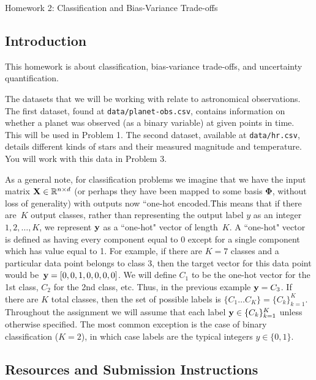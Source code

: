 \documentclass[submit]{harvardml}
\begin{document}
\begin{center}
{\Large Homework 2: Classification and Bias-Variance Trade-offs}\\
\end{center}

\subsection*{Introduction}

This homework is about classification, bias-variance trade-offs, and
uncertainty quantification.

The datasets that we will be working with relate to astronomical
observations. The first dataset, found at \verb|data/planet-obs.csv|,
contains information on whether a planet was observed (as a binary
variable) at given points in time. This will be used in Problem 1. The
second dataset, available at \verb|data/hr.csv|, details different
kinds of stars and their measured magnitude and temperature. You will
work with this data in Problem 3.

As a general note, for classification problems we imagine that we have
the input matrix $\mathbf{X} \in \mathbb{R}^{n \times d}$ (or perhaps they
have been mapped to some basis $\bm{\Phi}$, without loss of
generality) with outputs now ``one-hot encoded.\"  This means that if
there are~$K$ output classes, rather than representing the output
label $y$ as an integer~${1,2,\ldots,K}$, we represent $\mathbf{y}$ as a
``one-hot" vector of length~$K$. A ``one-hot" vector is defined as
having every component equal to 0 except for a single component which
has value equal to 1.  For example, if there are $K = 7$ classes and a
particular data point belongs to class 3, then the target vector for
this data point would be~$\mathbf{y} = [0,0,1,0,0,0,0]$.  We will define
$C_1$ to be the one-hot vector for the 1st class, $C_2$ for the 2nd
class, etc.  Thus, in the previous example $\mathbf{y} = C_3$. If there
are $K$ total classes, then the set of possible labels is $\{C_1
\ldots C_K \} = \{C_k\}_{k=1}^K$.  Throughout the assignment we will
assume that each label $\mathbf{y} \in \{C_k\}_{k=1}^K$ unless otherwise
specified. The most common exception is the case of binary
classification ($K = 2$), in which case labels are the typical
integers $y \in \{0, 1\}$.

\subsection*{Resources and Submission Instructions}
\end{document}
